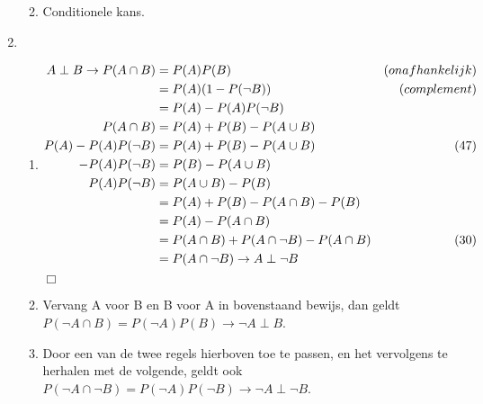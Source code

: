 \documentclass{article}
\begin{document}
\begin{enumerate}
\begin{enumerate}
\begin{minipage}[t]{\linewidth}
                    \end{minipage}

            \item
                Conditionele kans.

        \end{enumerate}

    \item
        \begin{enumerate}
            \item
                \begin{align}
                    A \perp B \to P(A \cap B) &= P(A) P(B) & (onafhankelijk) \notag \\
                                              &= P(A) (1 - P(\lnot B)) & (complement)
                    \notag \\
                                              &= P(A) -P(A)P(\lnot B) \\
                    P(A \cap B) &= P(A) + P(B) - P(A \cup B) \notag \\
                    P(A) - P(A) P(\lnot B) &= P(A) + P(B) - P(A \cup B) & (47) \\
                    -P(A) P(\lnot B) &= P(B) - P(A \cup B) \notag \\
                    P(A) P(\lnot B) &= P(A \cup B) - P(B) \notag \\
                                    &= P(A) + P(B) - P(A \cap B) - P(B) \notag \\
                                    &= P(A) - P(A \cap B) \notag \\
                                    &= P(A \cap B) + P(A \cap \lnot B) - P(A \cap B)
                    & (30) \notag \\
                    &= P(A \cap \lnot B) \to A \perp \lnot B
                \end{align}
                $\Box$

            \item
                Vervang A voor B en B voor A in bovenstaand bewijs, dan geldt
                $P(\lnot A \cap B) = P(\lnot A) P(B) \to \lnot A \perp B$.

            \item
                Door een van de twee regels hierboven toe te passen, en het
                vervolgens te herhalen met de volgende, geldt ook $P(\lnot A
                \cap \lnot B) = P(\lnot A) P(\lnot B) \to \lnot A \perp \lnot
                B$.


\end{enumerate}
\end{enumerate}
\end{document}
